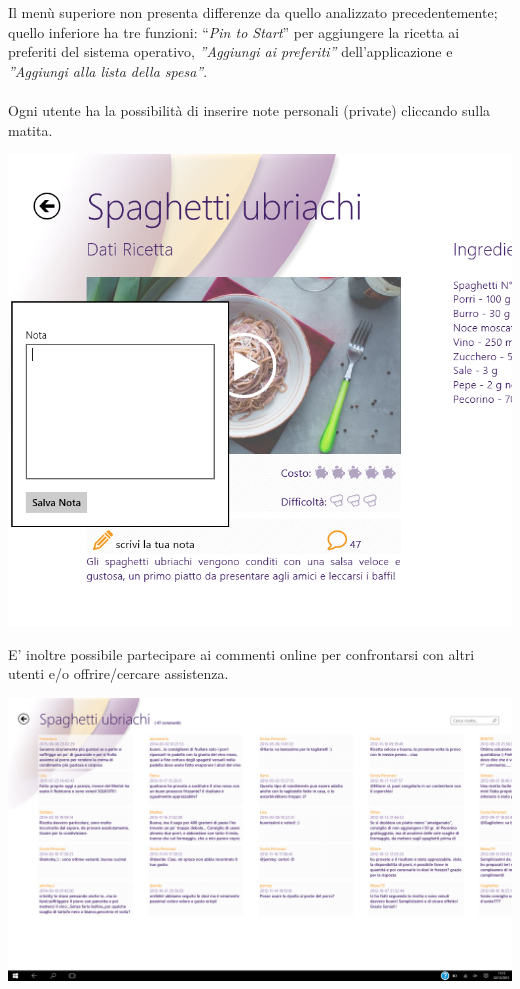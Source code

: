 Il menù superiore non presenta differenze da quello analizzato precedentemente; quello inferiore ha tre funzioni: ``\textit{Pin to Start}'' per aggiungere la ricetta ai preferiti del sistema operativo, \textit{''Aggiungi ai preferiti''} dell'applicazione e \textit{''Aggiungi alla lista della spesa''}.\\\\
\newpage
Ogni utente ha la possibilità di inserire note personali (private) cliccando sulla matita.

\begin{center}
\includegraphics[scale=0.4] {img/Giallozafferano/ricetta_nota.png}  
\end{center}

E' inoltre possibile partecipare ai commenti online per confrontarsi con altri utenti e/o offrire/cercare assistenza.

\begin{center}
\includegraphics[scale=0.275] {img/Giallozafferano/ricetta_commenti.png}  
\end{center}

